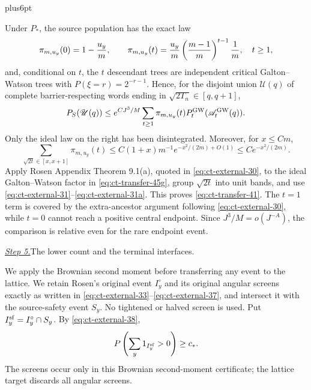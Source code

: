 \documentclass[12pt,reqno]{amsart}
\makeatletter
\theoremstyle{plain}
\theoremstyle{definition}
\theoremstyle{remark}
\renewenvironment{proof}[1][\proofname]{%
  \par
  \pushQED{\qed}%
  \normalfont
  \topsep6pt plus6pt\relax
  \trivlist
  \item[\hskip\labelsep\slshape #1\@addpunct{.}]%
  \ignorespaces
}{%
  \popQED
  \endtrivlist
  \@endpefalse
}
\DeclareRobustCommand{\qed}{%
  \leavevmode\unskip\penalty9999\hbox{}\nobreak
  \ifmmode
    \makebox[0pt][l]{\qquad\hbox{\qedsymbol}}%
  \else
    \qquad\hbox{\qedsymbol}%
  \fi
}
\renewcommand{\qedsymbol}{\rule[.47pt]{4pt}{6pt}}
\numberwithin{equation}{section}
\makeatother
\begin{document}
\begin{proof}[Proof of Lemma~\ref{lem:buffered-transfer}]
Under $P_*$, the source population has the exact law
\begin{equation}
\pi_{m,u_y}(0)=1-{u_y\over m},\qquad
 \pi_{m,u_y}(t)={u_y\over m}
       \left({m-1\over m}\right)^{t-1}{1\over m},
       \quad t\ge1,\label{eq:ct-transfer-45g0}
\end{equation}
and, conditional on $t$, the $t$ descendant trees are independent
critical Galton--Watson trees with
$P(\xi=r)=2^{-r-1}$.  Hence, for the disjoint union
$\mathscr U(q)$ of complete barrier-respecting words ending in
$\sqrt{2T_n}\in[q,q+1]$,
\begin{equation}
P_S(\mathscr U(q))
 \le e^{CJ^3/M}\sum_{t\ge1}\pi_{m,u_y}(t)
       P_t^{\rm GW}(\mathscr A_t^{\rm GW}(q)).\label{eq:ct-transfer-45g}
\end{equation}
Only the ideal law on the right has been disintegrated.  Moreover, for
$x\le Cm$,
\begin{equation}
\sum_{\sqrt{2t}\in[x,x+1]}\pi_{m,u_y}(t)
 \le C(1+x)m^{-1}e^{-x^2/(2m)+O(1)}
 \le Ce^{-x^2/(2m)}.\label{eq:ct-transfer-45gprime}
\end{equation}
Apply Rosen Appendix Theorem 9.1(a), quoted in \eqref{eq:ct-external-30}, to the
ideal Galton--Watson factor in \eqref{eq:ct-transfer-45g}, group $\sqrt{2t}$ into unit bands,
and use \eqref{eq:ct-external-31}--\eqref{eq:ct-external-31a}.  This proves \eqref{eq:ct-transfer-41}.  The $t=1$ term is covered by
the extra-ancestor argument following \eqref{eq:ct-external-30}, while $t=0$ cannot reach a
positive central endpoint.  Since $J^3/M=o(J^{-A})$, the comparison is
relative even for the rare endpoint event.

\smallskip\noindent
\underline{\textit{Step 5.}}\quad The lower count and the terminal interfaces.

We apply the Brownian second moment before transferring any event to the lattice.  We retain Rosen's original event
$I_y^\circ$ and its original angular screens exactly as written in
\eqref{eq:ct-external-33}--\eqref{eq:ct-external-37}, and intersect it with the source-safety event $S_y$.
No tightened or halved screen is used.  Put
$I_y^{\rm sf}=I_y^\circ\cap S_y$.  By \eqref{eq:ct-external-38},
\begin{equation}
P\left(\sum_y1_{I_y^{\rm sf}}>0\right)\ge c_* .\label{eq:ct-transfer-46}
\end{equation}
The screens occur only in this Brownian second-moment certificate; the
lattice target discards all angular screens.


\end{proof}
\end{document}
